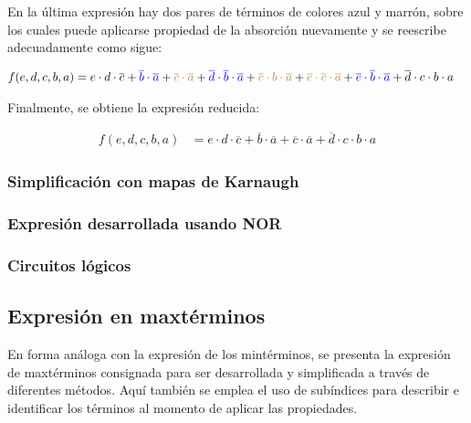 En la \'ultima expresi\'on hay dos pares de t\'erminos de colores azul y marr\'on, sobre los cuales
puede aplicarse propiedad de la absorci\'on nuevamente y se reescribe adecuadamente como sigue:

\begin{equation*}
\begin{align*}
f(e,d,c,b,a) & = {e \cdot d \cdot \overline{c}}
+ {\color{blue} \overline{b} \cdot \overline{a}}
+ {\color{brown} \overline{c} \cdot \overline{a}}
+ {\color{blue} \overline{d} \cdot \overline{b} \cdot \overline{a}}
+ {\color{brown} \overline{c} \cdot b \cdot \overline{a}}
+ {\color{brown} \overline{e} \cdot \overline{c} \cdot \overline{a}}
+ {\color{blue} \overline{e} \cdot \overline{b} \cdot \overline{a}}
+ {\overline{d} \cdot c \cdot b \cdot a}
\end{align*}
\end{equation*}

Finalmente, se obtiene la expresi\'on reducida:

\begin{equation*}
\begin{align*}
f(e,d,c,b,a) & = {e \cdot d \cdot \overline{c}}
+ {\overline{b} \cdot \overline{a}}
+ {\overline{c} \cdot \overline{a}}
+ {\overline{d} \cdot c \cdot b \cdot a}
\end{align*}
\end{equation*}

\subsubsection{Simplificación con mapas de Karnaugh}

\subsubsection{Expresión desarrollada usando NOR}

\subsubsection{Circuitos lógicos}

\subsection{Expresi\'on en maxt\'erminos}
En forma an\'aloga con la expresi\'on de los mint\'erminos, se presenta la expresi\'on de maxt\'erminos consignada para ser
desarrollada y simplificada a trav\'es de diferentes m\'etodos. Aqu\'i tambi\'en se emplea el uso de sub\'indices para describir
e identificar los t\'erminos al momento de aplicar las propiedades.

